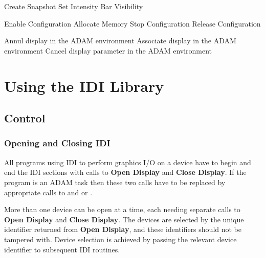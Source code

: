 \begin{routinelist}
               {Create Snapshot}
               {Set Intensity Bar Visibility}
\end{routinelist}
\begin{routinelist}
               {Enable Configuration}
               {Allocate Memory}
               {Stop Configuration}
               {Release Configuration}
\end{routinelist}
\begin{routinelist}
               {Annul display in the ADAM environment}
               {Associate display in the ADAM environment}
               {Cancel display parameter in the ADAM environment}
\end{routinelist}

\section{Using the IDI Library}

\subsection{Control}

\subsubsection{Opening and Closing IDI}

All programs using IDI to perform graphics I/O on a device have to begin and
end the IDI sections with calls to {\bf Open Display} and {\bf Close Display}.
If the program is an ADAM task then these two calls have to be replaced by
appropriate calls to  and 
 or 
.

More than one device can be open at a time, each needing separate calls
to {\bf Open Display} and {\bf Close Display}. The devices are selected
by the unique identifier returned from {\bf Open Display}, and these
identifiers should not be tampered with. Device selection is achieved by
passing the relevant device identifier to subsequent IDI routines.

